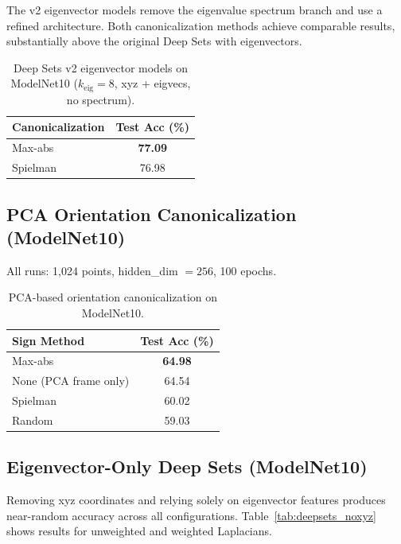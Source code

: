 \documentclass[11pt]{article}
\begin{document}
The v2 eigenvector models remove the eigenvalue spectrum branch and use a refined
architecture. Both canonicalization methods achieve comparable results, substantially
above the original Deep Sets with eigenvectors.

\begin{table}[ht]
\centering
\caption{Deep Sets v2 eigenvector models on ModelNet10 ($k_{\text{eig}} = 8$, xyz + eigvecs, no spectrum).}
\label{tab:deepsets_v2}
\begin{tabular}{lc}
\toprule
\textbf{Canonicalization} & \textbf{Test Acc (\%)} \\
\midrule
Max-abs & \textbf{77.09} \\
Spielman & 76.98 \\
\bottomrule
\end{tabular}
\end{table}

\subsection{PCA Orientation Canonicalization (ModelNet10)}

All runs: 1,024 points, hidden\_dim $= 256$, 100 epochs.

\begin{table}[ht]
\centering
\caption{PCA-based orientation canonicalization on ModelNet10.}
\label{tab:pca}
\begin{tabular}{lc}
\toprule
\textbf{Sign Method} & \textbf{Test Acc (\%)} \\
\midrule
Max-abs & \textbf{64.98} \\
None (PCA frame only) & 64.54 \\
Spielman & 60.02 \\
Random & 59.03 \\
\bottomrule
\end{tabular}
\end{table}

\subsection{Eigenvector-Only Deep Sets (ModelNet10)}

Removing xyz coordinates and relying solely on eigenvector features produces near-random
accuracy across all configurations. Table~\ref{tab:deepsets_noxyz} shows results for
unweighted and weighted Laplacians.
\end{document}
